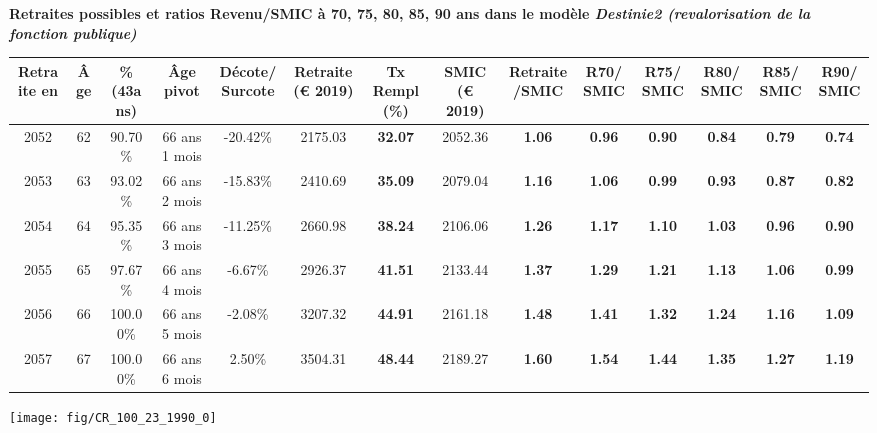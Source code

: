  \vspace{0.1cm} 
{\bf \noindent Retraites possibles et ratios Revenu/SMIC à 70, 75, 80, 85, 90 ans dans le modèle \emph{Destinie2 (revalorisation de la fonction publique)}}  
 
\begin{adjustbox}{max width=\textwidth} 
\begin{tabular}[htb]{|c|c||c|c|c||c|c||c|c||c|c|c|c|c|} 
\hline 
 Retraite en &  Âge &  \%(43ans) &  Âge pivot &  Décote/Surcote &  Retraite (\euro{} 2019) &  Tx Rempl(\%) &  SMIC (\euro{} 2019) &  Retraite/SMIC &  R70/SMIC &  R75/SMIC &  R80/SMIC &  R85/SMIC &  R90/SMIC \\ 
\hline \hline 
 2052 &  62 &  90.70\% &  66 ans 1 mois &  -20.42\% &  2175.03 &  {\bf 32.07} &  2052.36 &  {\bf 1.06} &  {\bf {\color{red} 0.96}} &  {\bf {\color{red} 0.90}} &  {\bf {\color{red} 0.84}} &  {\bf {\color{red} 0.79}} &  {\bf {\color{red} 0.74}} \\ 
\hline 
 2053 &  63 &  93.02\% &  66 ans 2 mois &  -15.83\% &  2410.69 &  {\bf 35.09} &  2079.04 &  {\bf 1.16} &  {\bf 1.06} &  {\bf {\color{red} 0.99}} &  {\bf {\color{red} 0.93}} &  {\bf {\color{red} 0.87}} &  {\bf {\color{red} 0.82}} \\ 
\hline 
 2054 &  64 &  95.35\% &  66 ans 3 mois &  -11.25\% &  2660.98 &  {\bf 38.24} &  2106.06 &  {\bf 1.26} &  {\bf 1.17} &  {\bf 1.10} &  {\bf 1.03} &  {\bf {\color{red} 0.96}} &  {\bf {\color{red} 0.90}} \\ 
\hline 
 2055 &  65 &  97.67\% &  66 ans 4 mois &  -6.67\% &  2926.37 &  {\bf 41.51} &  2133.44 &  {\bf 1.37} &  {\bf 1.29} &  {\bf 1.21} &  {\bf 1.13} &  {\bf 1.06} &  {\bf {\color{red} 0.99}} \\ 
\hline 
 2056 &  66 &  100.00\% &  66 ans 5 mois &  -2.08\% &  3207.32 &  {\bf 44.91} &  2161.18 &  {\bf 1.48} &  {\bf 1.41} &  {\bf 1.32} &  {\bf 1.24} &  {\bf 1.16} &  {\bf 1.09} \\ 
\hline 
 2057 &  67 &  100.00\% &  66 ans 6 mois &  2.50\% &  3504.31 &  {\bf 48.44} &  2189.27 &  {\bf 1.60} &  {\bf 1.54} &  {\bf 1.44} &  {\bf 1.35} &  {\bf 1.27} &  {\bf 1.19} \\ 
\hline 
\hline 
\end{tabular} 
\end{adjustbox} 
 
 \vspace{0.1cm} 

 {\hspace{-2.2cm}\texttt{[image: fig/CR\_100\_23\_1990\_0]}} 


